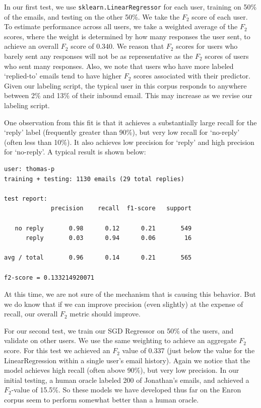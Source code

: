 \documentclass[10pt]{article}
\begin{document}
In our first test, we use \texttt{sklearn.LinearRegressor} for each user, training on 50\% of the emails, and testing on the other 50\%. We take the $F_2$ score of each user. To estimate performance across all users, we take a weighted average of the $F_2$ scores, where the weight is determined by how many responses the user sent, to achieve an overall $F_2$ score of 0.340. We reason that $F_2$ scores for users who barely sent any responses will not be as representative as the $F_2$ scores of users who sent many responses. Also, we note that users who have more labeled `replied-to' emails tend to have higher $F_2$ scores associated with their predictor. Given our labeling script, the typical user in this corpus responds to anywhere between 2\% and 13\% of their inbound email. This may increase as we revise our labeling script.

One observation from this fit is that it achieves a substantially large recall for the `reply' label (frequently greater than 90\%), but very low recall for `no-reply' (often less than 10\%). It also achieves low precision for `reply' and high precision for `no-reply'. A typical result is shown below:

\begin{center}
\begin{verbatim}
user: thomas-p
training + testing: 1130 emails (29 total replies)

test report:
             precision    recall  f1-score   support

   no reply       0.98      0.12      0.21       549
      reply       0.03      0.94      0.06        16

avg / total       0.96      0.14      0.21       565

f2-score = 0.133214920071
\end{verbatim}
\end{center}

At this time, we are not sure of the mechanism that is causing this behavior. But we do know that if we can improve precision (even slightly) at the expense of recall, our overall $F_2$ metric should improve.

For our second test, we train our SGD Regressor on 50\% of the users, and validate on other users. We use the same weighting to achieve an aggregate $F_2$ score. For this test we achieved an $F_2$ value of 0.337 (just below the value for the LinearRegression within a single user's email history).
 Again we notice that the model achieves high recall (often above 90\%), but very low precision.
In our initial testing, a human oracle labeled 200 of Jonathan's emails, and achieved a $F_2$-value of 15.5\%. So these models we have developed thus far on the Enron corpus seem to perform somewhat better than a human oracle.
\end{document}
